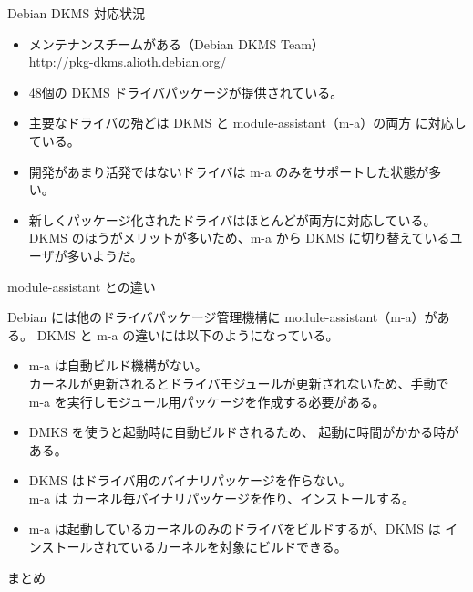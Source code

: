 \begin{frame}[containsverbatim]{Debian DKMS 対応状況}

\begin{itemize}
\item メンテナンスチームがある（Debian DKMS Team）\\
\url{http://pkg-dkms.alioth.debian.org/}
\item 48個の DKMS ドライバパッケージが提供されている。
\item 主要なドライバの殆どは DKMS と module-assistant（m-a）の両方
に対応している。
\item 開発があまり活発ではないドライバは m-a のみをサポートした状態が多い。
\item 新しくパッケージ化されたドライバはほとんどが両方に対応している。
DKMS のほうがメリットが多いため、m-a から DKMS に切り替えているユーザが多いようだ。
\end{itemize}

\end{frame}

\begin{frame}[containsverbatim]{module-assistant との違い}

Debian には他のドライバパッケージ管理機構に 
module-assistant（m-a）がある。
DKMS と m-a の違いには以下のようになっている。
\begin{itemize}
\item m-a は自動ビルド機構がない。\\
カーネルが更新されるとドライバモジュールが更新されないため、手動で m-a を実行しモジュール用パッケージを作成する必要がある。
\item DMKS を使うと起動時に自動ビルドされるため、
起動に時間がかかる時がある。
\item DKMS はドライバ用のバイナリパッケージを作らない。\\
m-a は カーネル毎バイナリパッケージを作り、インストールする。
\item m-a は起動しているカーネルのみのドライバをビルドするが、DKMS は
インストールされているカーネルを対象にビルドできる。

\end{itemize}

\end{frame}


\begin{frame}
\large\bfseries
\begin{center}
まとめ
\end{center}
\end{frame}


